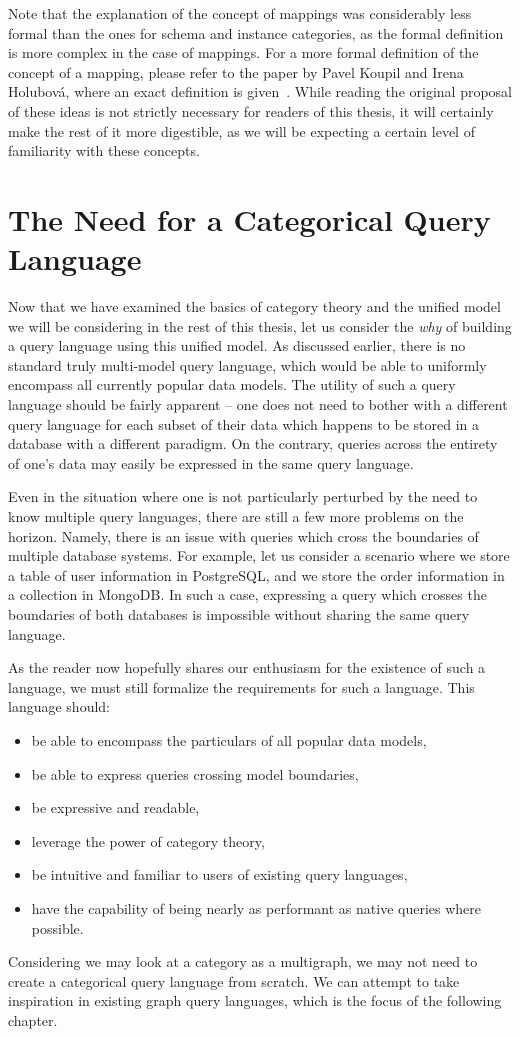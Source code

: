 Note that the explanation of the concept of mappings was considerably less formal than the ones for schema and instance categories, as the formal definition is more complex in the case of mappings.
For a more formal definition of the concept of a mapping, please refer to the paper by Pavel Koupil and Irena Holubov{\'a}, where an exact definition is given~\cite{unified_representation}. 
While reading the original proposal of these ideas is not strictly necessary for readers of this thesis, it will certainly make the rest of it more digestible, as we will be expecting a certain level of familiarity with these concepts.

\section{The Need for a Categorical Query Language}
\label{category:section:querylanguage}

Now that we have examined the basics of category theory and the unified model we will be considering in the rest of this thesis, let us consider the \textit{why} of building a query language using this unified model.
As discussed earlier, there is no standard truly multi-model query language, which would be able to uniformly encompass all currently popular data models.
The utility of such a query language should be fairly apparent -- one does not need to bother with a different query language for each subset of their data which happens to be stored in a database with a different paradigm.
On the contrary, queries across the entirety of one's data may easily be expressed in the same query language.

Even in the situation where one is not particularly perturbed by the need to know multiple query languages, there are still a few more problems on the horizon.
Namely, there is an issue with queries which cross the boundaries of multiple database systems.
For example, let us consider a scenario where we store a table of user information in PostgreSQL, and we store the order information in a collection in MongoDB.
In such a case, expressing a query which crosses the boundaries of both databases is impossible without sharing the same query language.

As the reader now hopefully shares our enthusiasm for the existence of such a language, we must still formalize the requirements for such a language.
This language should:

\begin{itemize}
    \item be able to encompass the particulars of all popular data models,
    \item be able to express queries crossing model boundaries,
    \item be expressive and readable,
    \item leverage the power of category theory,
    \item be intuitive and familiar to users of existing query languages,
    \item have the capability of being nearly as performant as native queries where possible.
\end{itemize}

Considering we may look at a category as a multigraph, we may not need to create a categorical query language from scratch.
We can attempt to take inspiration in existing graph query languages, which is the focus of the following chapter.

